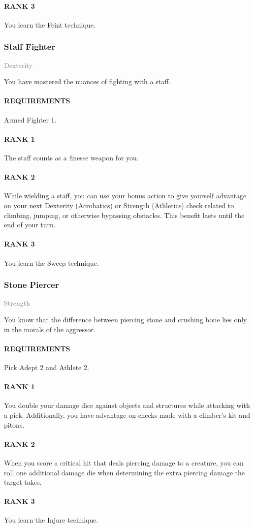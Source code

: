 \paragraph{RANK 3} You learn the Feint technique.

\subsubsection{Staff Fighter} \label{feat::stafffighter}
\small{\textcolor{gray}{Dexterity}}

\normalsize
You have mastered the nuances of fighting with a staff.
\paragraph{REQUIREMENTS} Armed Fighter 1.
\paragraph{RANK 1} The staff counts as a finesse weapon for you.
\paragraph{RANK 2} While wielding a staff, you can use your bonus action to give yourself advantage on your next Dexterity (Acrobatics) or Strength (Athletics) check related to climbing, jumping, or otherwise bypassing obstacles.
This benefit lasts until the end of your turn.
\paragraph{RANK 3} You learn the Sweep technique.

\subsubsection{Stone Piercer} \label{feat::stonepiercer}
\small{\textcolor{gray}{Strength}}

\normalsize
You know that the difference between piercing stone and crushing bone lies only in the morals of the aggressor.
\paragraph{REQUIREMENTS} Pick Adept 2 and Athlete 2.
\paragraph{RANK 1} You double your damage dice against objects and structures while attacking with a pick.
Additionally, you have advantage on checks made with a climber's kit and pitons.
\paragraph{RANK 2} When you score a critical hit that deals piercing damage to a creature, you can roll one additional damage die when determining the extra piercing damage the target takes.
\paragraph{RANK 3} You learn the Injure technique.
